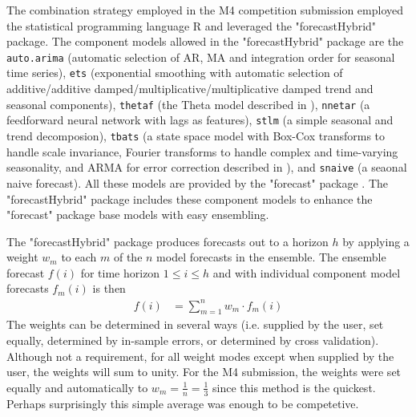 \documentclass[11pt,3p,review,authoryear]{elsarticle}
\begin{document}
The combination strategy employed in the M4 competition submission employed the statistical programming language R \citep{Rlang} and leveraged the "forecastHybrid" \citep{forecastHybrid} package. The component models allowed in the "forecastHybrid" package are the  \lstinline{auto.arima} (automatic selection of AR, MA and integration order for seasonal time series), \lstinline{ets} (exponential smoothing with automatic selection of additive/additive damped/multiplicative/multiplicative damped trend and seasonal components), \lstinline{thetaf} (the Theta model described in \cite{THETA}), \lstinline{nnetar} (a feedforward neural network with lags as features), \lstinline{stlm} (a simple seasonal and trend decomposion), \lstinline{tbats} (a state space model with Box-Cox transforms to handle scale invariance, Fourier transforms to handle complex and time-varying seasonality, and ARMA for error correction described in \cite{TBATS}), and \lstinline{snaive} (a seaonal naive forecast). All these models are provided by the "forecast" package \citep{Forecast}. The "forecastHybrid" package includes these component models to enhance the "forecast" package base models with easy ensembling.

The "forecastHybrid" package produces forecasts out to a horizon $h$ by applying a weight $w_m$ to each $m$ of the $n$ model forecasts in the ensemble. The ensemble forecast $f(i)$ for time horizon $1 \leq i \leq h$ and with individual component model forecasts $f_m(i)$ is then
\begin{align}
f(i) & = \sum_{m=1}^n w_m\cdot f_m(i)
\end{align}
The weights can be determined in several ways (i.e. supplied by the user, set equally, determined by in-sample errors, or determined by cross validation). Although not a requirement, for all weight modes except when supplied by the user, the weights will sum to unity. For the M4 submission, the weights were set equally and automatically to $w_m = \frac{1}{n} = \frac{1}{3}$ since this method is the quickest. Perhaps surprisingly this simple average was enough to be competetive.
\end{document}
